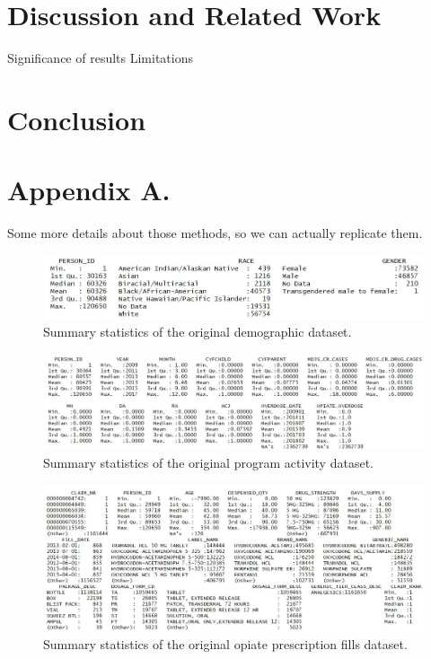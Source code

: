 \documentclass[twoside,10.5pt]{article}
\begin{document}
\section{Discussion and Related Work}
Significance of results
Limitations 

\section{Conclusion}

\newpage
\appendix
\section*{Appendix A.}
Some more details about those methods, so we can actually replicate them.


\begin{figure}
\begin{center}
\includegraphics[width=5in]{original_dem_summary.JPG}
\end{center}
\caption{Summary statistics of the original demographic dataset.}
\label{fig:orig_dem}
\end{figure}

\begin{figure}
\begin{center}
\includegraphics[width=6in]{original_prog_summary.JPG}
\end{center}
\caption{Summary statistics of the original program activity dataset.}
\label{fig:orig_prog}
\end{figure}

\begin{figure}
\begin{center}
\includegraphics[width=6in]{original_presc_summary.JPG}
\end{center}
\caption{Summary statistics of the original opiate prescription fills dataset.}
\label{fig:orig_presc}
\end{figure}

\newpage
\theendnotes


\end{document}
